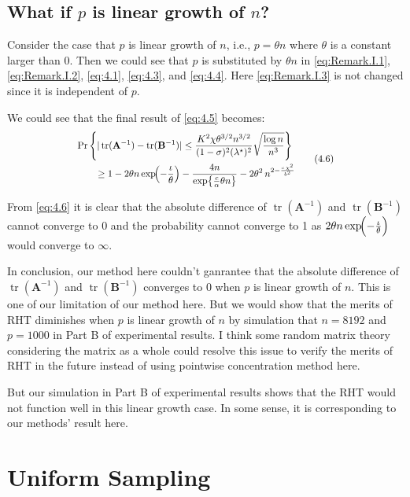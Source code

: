 \documentclass[11pt]{article}
\numberwithin{equation}{section}
\theoremstyle{plain}
\theoremstyle{definition}
\theoremstyle{remark}
\begin{document}
\subsection{What if $p$ is linear growth of $n$?}
Consider the case that $p$ is linear growth of $n$, i.e., $p = \theta n$ where $\theta$ is a constant larger than 0. Then we could see that $p$ is substituted by $\theta n$ in \ref{eq:Remark.I.1}, \ref{eq:Remark.I.2}, \ref{eq:4.1}, \ref{eq:4.3}, and \ref{eq:4.4}. Here \ref{eq:Remark.I.3} is not changed since it is independent of $p$.

We could see that the final result of \ref{eq:4.5} becomes:
\[
\scalebox{0.87}{$
  \begin{aligned}
  &\Pr\left\{|\operatorname{tr}(\mathbf{A}^{-1}) - \operatorname{tr}(\mathbf{B}^{-1})| \leq \frac{K^{2}\chi \theta^{3/2} n^{3/2}}{(1-\sigma)^{2}(\lambda^{\star})^{2}} \sqrt{\frac{\log n}{n^3}}\right\} \\
  &\qquad \geq 1 - 2\theta n\exp\!\Bigl(-\frac{\iota}{\theta}\Bigr) - \frac{4 n}{\exp\bigl\{\frac{c}{\alpha} \theta n\bigr\}} - 2\theta^{2}\,n^{2 -\frac{c\,\chi^{2}}{b^{2}}}
  \end{aligned}\tag{4.6}\label{eq:4.6}
$}
\]

From \ref{eq:4.6} it is clear that the absolute difference of $\operatorname{tr}(\mathbf{A}^{-1})$ and $\operatorname{tr}(\mathbf{B}^{-1})$ cannot converge to 0 and the probability cannot converge to 1 as $2\theta n\exp\!\Bigl(-\frac{\iota}{\theta}\Bigr)$ would converge to $\infty$.

In conclusion, our method here couldn't ganrantee that the absolute difference of $\operatorname{tr}(\mathbf{A}^{-1})$ and $\operatorname{tr}(\mathbf{B}^{-1})$ converges to 0 when $p$ is linear growth of $n$. This is one of our limitation of our method here. But we would show that the merits of RHT diminishes when $p$ is linear growth of $n$ by simulation that $n=8192$ and $p=1000$ in Part B of experimental results. I think some random matrix theory considering the matrix as a whole could resolve this issue to verify the merits of RHT in the future instead of using pointwise concentration method here.

But our simulation in Part B of experimental results shows that the RHT would not function well in this linear growth case. In some sense, it is corresponding to our methods' result here.
\section{Uniform Sampling}
\end{document}
